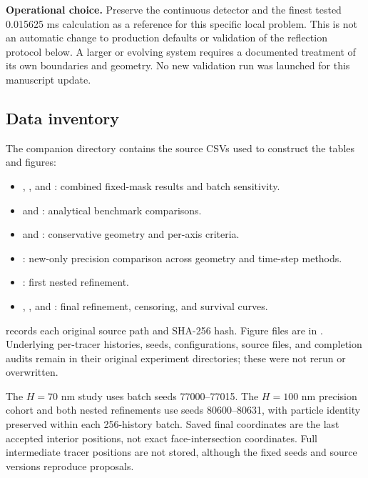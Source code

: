 \documentclass[a4paper,10pt]{article}
\numberwithin{equation}{section}
\begin{document}
\textbf{Operational choice.} Preserve the continuous detector and the finest tested 0.015625 ms calculation as a reference for this specific local problem. This is not an automatic change to production defaults or validation of the reflection protocol below. A larger or evolving system requires a documented treatment of its own boundaries and geometry. No new validation run was launched for this manuscript update.

\subsection*{Data inventory}
The companion directory  contains the source CSVs used to construct the tables and figures:
\begin{itemize}
\item {}, , and : combined fixed-mask results and batch sensitivity.
\item {} and : analytical benchmark comparisons.
\item {} and : conservative geometry and per-axis criteria.
\item {}: new-only precision comparison across geometry and time-step methods.
\item {}: first nested refinement.
\item {}, , and : final refinement, censoring, and survival curves.
\end{itemize}
 records each original source path and SHA-256 hash. Figure files are in . Underlying per-tracer histories, seeds, configurations, source files, and completion audits remain in their original experiment directories; these were not rerun or overwritten.

The $H=70$ nm study uses batch seeds 77000--77015. The $H=100$ nm precision cohort and both nested refinements use seeds 80600--80631, with particle identity preserved within each 256-history batch. Saved final coordinates are the last accepted interior positions, not exact face-intersection coordinates. Full intermediate tracer positions are not stored, although the fixed seeds and source versions reproduce proposals.
\end{document}
